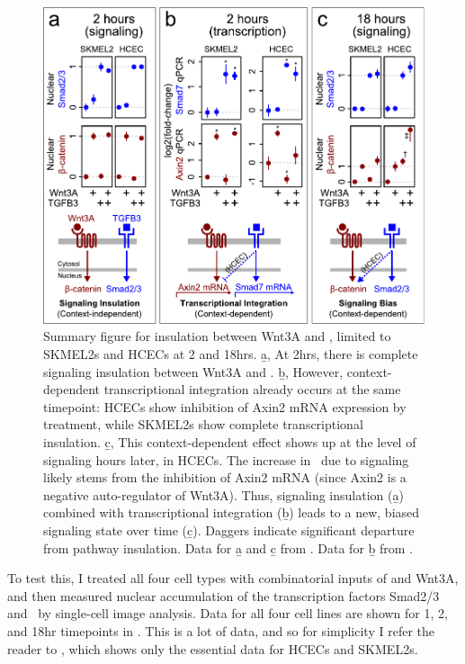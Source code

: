   \begin{figure}[!bt]
  \centering
  \includegraphics[width=5in]{FIGS/insulation/wntTgfb_summary.pdf}
  {\singlespacing 
  \caption[Wnt and \tgf\ are insulated during signal transduction (summary).]
        { Summary figure for insulation between Wnt3A and ,
          limited to SKMEL2s and HCECs at 2 and 18hrs.
          \b{a}, At 2hrs, there is complete signaling insulation between
          Wnt3A and .
          \b{b}, However, context-dependent transcriptional integration
          already occurs at the same timepoint: HCECs show inhibition of
          Axin2 mRNA expression by  treatment, while SKMEL2s show
          complete transcriptional insulation.
          \b{c}, This context-dependent effect shows up at the level
          of signaling hours later, in HCECs. The increase in \bcat\ due
          to  signaling likely stems from the inhibition of Axin2
          mRNA (since Axin2 is a negative auto-regulator of Wnt3A). Thus,
          signaling insulation (\b{a}) combined with transcriptional integration
          (\b{b}) leads to a new, biased signaling state over time (\b{c}).
          Daggers
          indicate significant departure from pathway insulation.
          Data for \b{a} and \b{c} from .
          Data for \b{b} from .
          }
  \label{fig:insulation:wntTgfbSummary}}
  \end{figure}
    

  
To test this, I treated all four cell types with combinatorial
inputs of  and Wnt3A, and then measured nuclear accumulation
of the transcription factors Smad2/3 and \bcat\ by
single-cell image analysis.
Data for all four cell lines are shown for 1, 2, and 18hr timepoints in
. This is a lot of data, and so
for simplicity I refer the reader to , which shows
only the essential data for HCECs and SKMEL2s.


